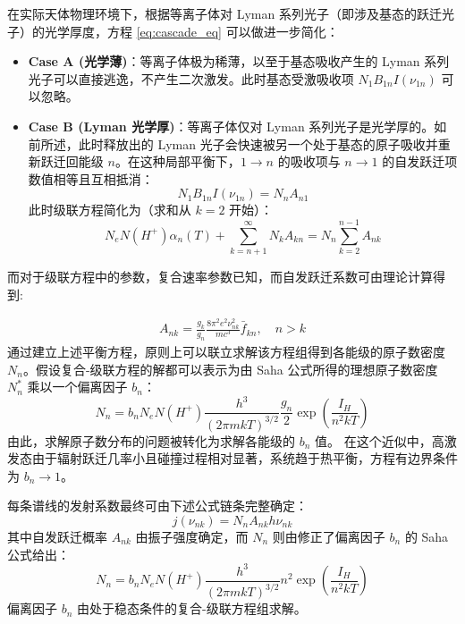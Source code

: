 在实际天体物理环境下，根据等离子体对 Lyman 系列光子（即涉及基态的跃迁光子）的光学厚度，方程 \eqref{eq:cascade_eq} 可以做进一步简化：

\begin{itemize}
    \item \textbf{Case A (光学薄)}：等离子体极为稀薄，以至于基态吸收产生的 Lyman 系列光子可以直接逃逸，不产生二次激发。此时基态受激吸收项 $N_1 B_{1n} I(\nu_{1n})$ 可以忽略。
    \item \textbf{Case B (Lyman 光学厚)}：等离子体仅对 Lyman 系列光子是光学厚的。如前所述，此时释放出的 Lyman 光子会快速被另一个处于基态的原子吸收并重新跃迁回能级 $n$。在这种局部平衡下，$1 \to n$ 的吸收项与 $n \to 1$ 的自发跃迁项数值相等且互相抵消：
    \begin{equation}
        N_1 B_{1n} I(\nu_{1n}) = N_n A_{n1} \nonumber
    \end{equation}
    此时级联方程简化为（求和从 $k=2$ 开始）：
    \begin{equation}
        N_e N(H^+) \alpha_n(T) + \sum_{k=n+1}^{\infty} N_k A_{kn} = N_n \sum_{k=2}^{n-1} A_{nk}
    \end{equation}
\end{itemize}

而对于级联方程中的参数，复合速率参数已知，而自发跃迁系数可由理论计算得到:

\begin{align}
    A_{nk} = \frac{g_k}{g_n} \frac{8\pi^2e^2\nu_{nk}^2}{mc^3}\bar{f}_{kn} , \quad n>k \nonumber
\end{align}
通过建立上述平衡方程，原则上可以联立求解该方程组得到各能级的原子数密度 $N_n$。假设复合-级联方程的解都可以表示为由 Saha 公式所得的理想原子数密度 $N_n^*$ 乘以一个偏离因子 $b_n$：
\begin{equation}
    N_n = b_n N_e N(H^+) \frac{h^3}{(2\pi mkT)^{3/2}} \frac{g_n}{2} \exp\left( \frac{I_H}{n^2 kT} \right)
\end{equation}
由此，求解原子数分布的问题被转化为求解各能级的 $b_n$ 值。
在这个近似中，高激发态由于辐射跃迁几率小且碰撞过程相对显著，系统趋于热平衡，方程有边界条件为 $b_n \to 1$。

\begin{derivationnote}[谱线发射系数的求解]
    每条谱线的发射系数最终可由下述公式链条完整确定：
    \begin{equation}
        j(\nu_{nk}) = N_n A_{nk} h\nu_{nk}
    \end{equation}
    其中自发跃迁概率 $A_{nk}$ 由振子强度确定，而 $N_n$ 则由修正了偏离因子 $b_n$ 的 Saha 公式给出：
    \begin{equation}
        N_n = b_n N_e N(H^+) \frac{h^3}{(2\pi mkT)^{3/2}} n^2 \exp\left( \frac{I_H}{n^2 kT} \right)
    \end{equation}
    偏离因子 $b_n$ 由处于稳态条件的复合-级联方程组求解。
\end{derivationnote}

